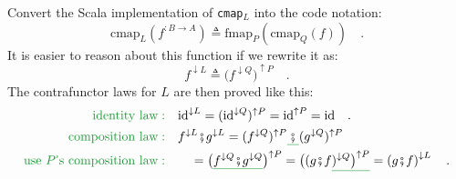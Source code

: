 Convert the Scala implementation of \lstinline!cmap!$_{L}$ into
the code notation:
\[
\text{cmap}_{L}(f^{:B\rightarrow A})\triangleq\text{fmap}_{P}(\text{cmap}_{Q}(f))\quad.
\]
It is easier to reason about this function if we rewrite it as:
\[
f^{\downarrow L}\triangleq\big(f^{\downarrow Q}\big)^{\uparrow P}\quad.
\]
The contrafunctor laws for $L$ are then proved like this:
\begin{align*}
{\color{greenunder}\text{identity law}:}\quad & \text{id}^{\downarrow L}=(\text{id}^{\downarrow Q})^{\uparrow P}=\text{id}^{\uparrow P}=\text{id}\quad.\\
{\color{greenunder}\text{composition law}:}\quad & f^{\downarrow L}\bef g^{\downarrow L}=(f^{\downarrow Q})^{\uparrow P}\gunderline{\,\bef\,}(g^{\downarrow Q})^{\uparrow P}\\
{\color{greenunder}\text{use }P\text{\textsf{'}s composition law}:}\quad & \quad=\big(\gunderline{f^{\downarrow Q}\bef g^{\downarrow Q}}\big)^{\uparrow P}=\big((g\bef f\gunderline{)^{\downarrow Q}\big)^{\uparrow P}}=\left(g\bef f\right)^{\downarrow L}\quad.
\end{align*}

